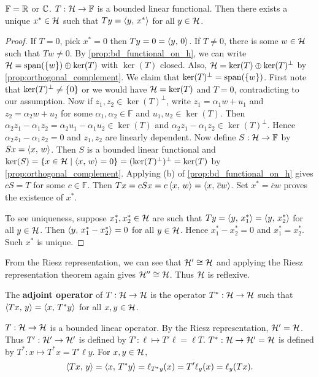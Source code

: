 \begin{theorem}
    $\mathbb{F} = \mathbb{R}$ or $\mathbb{C}$. $T:\mathcal{H}\to\mathbb{F}$ is a bounded linear 
    functional. Then there exists a unique $x^*\in\mathcal{H}$ such that 
    $Ty = \left\langle {y},\, {x^*} \right\rangle$ for all $y\in\mathcal{H}$.
\end{theorem}
\begin{proof}
    If $T = 0$, pick $x^* = 0$ then $Ty = 0 = \left\langle {y},\, {0} \right\rangle$. If $T\neq 0$, 
    there is some $w\in\mathcal{H}$ such that $Tw\neq 0$. By 
    \cref{prop:bd_functional_on_h}, we can write $\mathcal{H} = \operatorname{span}(\left\{ {w} \right\})\oplus\ker(T)$ 
    with $\ker(T)$ closed. Also, $\mathcal{H} = \ker(T)\oplus\ker(T)^{\perp}$ by 
    \cref{prop:orthogonal_complement}. We claim that $\ker(T)^{\perp} = \operatorname{span}(\left\{ {w} \right\})$. 
    First note that $\ker(T)^{\perp}\neq \left\{ {0} \right\}$ or we would have 
    $\mathcal{H} = \ker(T)$ and $T = 0$, contradicting to our assumption. Now if 
    $z_1,z_2\in\ker(T)^\perp$, write $z_1 = \alpha_1 w + u_1$ and 
    $z_2 = \alpha_2 w + u_2$ for some $\alpha_1,\alpha_2\in\mathbb{F}$ and 
    $u_1,u_2\in\ker(T)$. Then $\alpha_2z_1 - \alpha_1z_2 
    = \alpha_2u_1 - \alpha_1u_2\in\ker(T)$ and $\alpha_2z_1 - \alpha_1z_2
    \in\ker(T)^\perp$. Hence $\alpha_2z_1 - \alpha_1z_2 = 0$ and $z_1,z_2$ 
    are linearly dependent. Now define $S:\mathcal{H}\to\mathbb{F}$ by $Sx = \left\langle {x},\, {w} \right\rangle$. 
    Then $S$ is a bounded linear functional and $\ker(S) = \left\{ x\in\mathcal{H} \;\middle\vert\; \left\langle {x},\, {w} \right\rangle = 0 \right\} 
    = (\ker(T)^\perp)^\perp = \ker(T)$ by \cref{prop:orthogonal_complement}. 
    Applying (b) of \cref{prop:bd_functional_on_h} gives $cS = T$ for some 
    $c\in\mathbb{F}$. Then $Tx = cSx = c\left\langle {x},\, {w} \right\rangle = \left\langle {x},\, {\overline{c}w} \right\rangle$. 
    Set $x^* = \overline{c}w$ proves the existence of $x^*$. 

    To see uniqueness, suppose $x_1^*,x_2^*\in\mathcal{H}$ are such that 
    $Ty = \left\langle {y},\, {x_1^*} \right\rangle = \left\langle {y},\, {x_2^*} \right\rangle$ for all $y\in\mathcal{H}$. Then 
    $\left\langle {y},\, {x_1^* - x_2^*} \right\rangle = 0$ for all $y\in\mathcal{H}$. Hence 
    $x_1^* - x_2^* = 0$ and $x_1^* = x_2^*$. Such $x^*$ is unique.
\end{proof}
\begin{remark}
    From the Riesz representation, we can see that $\mathcal{H}'\cong\mathcal{H}$ 
    and applying the Riesz representation theorem again gives 
    $\mathcal{H}''\cong\mathcal{H}$. Thus $\mathcal{H}$ is reflexive.
\end{remark}

\begin{definition}
    The \textbf{adjoint operator} of $T:\mathcal{H}\to\mathcal{H}$ is the operator 
    $T^*:\mathcal{H}\to\mathcal{H}$ such that $\left\langle {Tx},\, {y} \right\rangle = \left\langle {x},\, {T^*y} \right\rangle$ for all $x,y\in\mathcal{H}$.
\end{definition}
\begin{remark}
    $T:\mathcal{H}\to\mathcal{H}$ is a bounded linear operator. By the Riesz representation, 
    $\mathcal{H}' = \mathcal{H}$. Thus $T':\mathcal{H}'\to\mathcal{H}'$ is defined by $T':\ell\mapsto T'\ell = \ell T$. 
    $T^*:\mathcal{H}\to\mathcal{H}' = \mathcal{H}$ is defined by $T^*:x\mapsto T^*x = T'\ell y$. 
    For $x,y\in\mathcal{H}$, 
    \begin{equation*}
        \left\langle {Tx},\, {y} \right\rangle = \left\langle {x},\, {T^*y} \right\rangle = \ell_{T^*y}(x) = T'\ell_y(x) = \ell_y(Tx).
    \end{equation*}
\end{remark}

